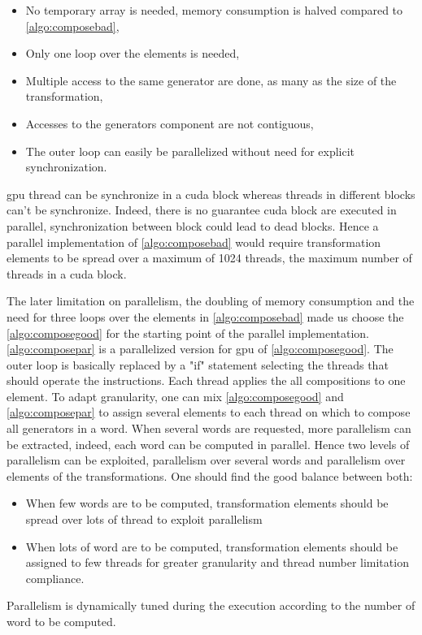 {\begin{itemize}
 \item No temporary array is needed, memory consumption is halved compared to \autoref{algo:composebad},
 \item Only one loop over the elements is needed,
 \item Multiple access to the same generator are done, as many as the size of the transformation,
 \item Accesses to the generators component are not contiguous,
 \item The outer loop can easily be parallelized without need for explicit synchronization.
\end{itemize}
\gls{gpu} thread can be synchronize in a cuda block whereas threads in different blocks can't be synchronize. Indeed, there is no guarantee cuda block are executed in parallel, synchronization between block could lead to dead blocks. Hence a parallel implementation of \autoref{algo:composebad} would require transformation elements to be spread over a maximum of 1024 threads, the maximum number of threads in a cuda block.

The later limitation on parallelism, the doubling of memory consumption and the need for three loops over the elements in \autoref{algo:composebad} made us choose the \autoref{algo:composegood} for the starting point of the parallel implementation.
\autoref{algo:composepar} is a parallelized version for \gls{gpu} of \autoref{algo:composegood}. The outer loop is basically replaced by a "if" statement selecting the threads that should operate the instructions. Each thread applies the all compositions to one element. To adapt granularity, one can mix \autoref{algo:composegood} and \autoref{algo:composepar} to assign several elements to each thread on which to compose all generators in a word.
When several words are requested, more parallelism can be extracted, indeed, each word can be computed in parallel. Hence two levels of parallelism can be exploited, parallelism over several words and parallelism over elements of the transformations. One should find the good balance between both:
\begin{itemize}
\item When few words are to be computed, transformation elements should be spread over lots of thread to exploit parallelism
\item When lots of word are to be computed, transformation elements should be assigned to few threads for greater granularity and thread number limitation compliance.
\end{itemize}
Parallelism is dynamically tuned during the execution according to the number of word to be computed.



}
